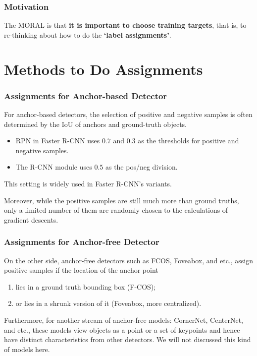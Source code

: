 \documentclass[slidetop, mathserif, dvipsnames]{beamer}
\begin{document}
\begin{frame}
    \frametitle{Motivation}

    The MORAL is that {\bf it is important to choose training targets},
    that is, to re-thinking about how to do the {\bf `label assignments'}.

\end{frame}

\section{Methods to Do Assignments}

\begin{frame}
    \frametitle{Assignments for Anchor-based Detector}

    For anchor-based detectors, the selection of positive and negative samples
    is often determined by the IoU of anchors and ground-truth objects.

    \begin{itemize}
    \item RPN in Faster R-CNN uses $0.7$ and $0.3$ as the thresholds for positive
        and negative samples.
    \item The R-CNN module uses $0.5$ as the pos/neg division.
    \end{itemize}
    This setting is widely used in Faster R-CNN's variants.

    \quad

    Moreover, while the positive samples are still much more than ground truths,
    only a limited number of them are randomly chosen to the calculations of
    gradient descents.

\end{frame}

\begin{frame}
    \frametitle{Assignments for Anchor-free Detector}

    On the other side, anchor-free detectors such as FCOS, Foveabox, and etc.,
    assign positive samples if the location of the anchor point 
    \begin{enumerate}
    \item lies in a ground truth bounding box (F-COS);
    \item or lies in a shrunk version of it (Foveabox, more centralized).
    \end{enumerate}

    \quad

    Furthermore, for another stream of anchor-free models:
    CornerNet, CenterNet, and etc., these models view objects as a point or
    a set of keypoints and hence have distinct characteristics from other
    detectors. We will not discussed this kind of models here.
    
\end{frame}
\end{document}
